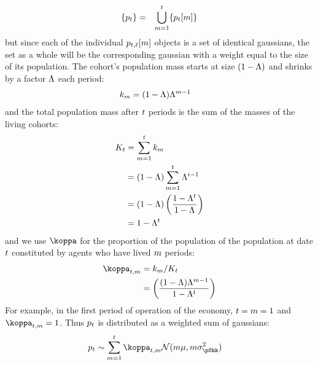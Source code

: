 \documentclass[../BufferStockTheory.tex]{subfiles}\usepackage{ApndxSteadyState}
\begin{document}
  \begin{eqnarray}
    \{p_{t}\} & = & \bigcup_{m=1}^{t}\{p_{t}[m]\}
  \end{eqnarray}
  but since each of the individual $p_{t,\ell}[m]$ objects is a set of identical gaussians, the set as a whole will be the corresponding gaussian with a weight equal to the size of its population.  The cohort's population mass starts at size $(1-\Lambda)$ and shrinks by a factor $\Lambda$ each period:
  \begin{align}
    k_{m} & =  (1-\Lambda)\Lambda^{m-1} \label{eq:mass}
  \end{align}
  and the total population mass after $t$ periods is the sum of the masses of the living cohorts:
  \begin{align}
    K_{t} & =  \sum_{m=1}^{t}k_{m}
    \\ & =  (1-\Lambda)\sum_{m=1}^{t}\Lambda^{i-1}
    \\ & =  (1-\Lambda)\left(\frac{1-\Lambda^{t}}{1-\Lambda}\right)
    \\ & = 1-\Lambda^{t}
  \end{align}
  and we use $\wgt$ for the proportion of the population of the population at date $t$ constituted by agents who have lived $m$ periods:
  \begin{align}
    \wgt_{\FutPer,\LooPer} & =  \mass_{\LooPer}/\Mass_{\FutPer}
    \\ & = \left(\frac{(1-\Liv)\Liv^{\LooPer-1}}{1-\Liv^{\FutPer}}\right) \label{eq:wgt}
  \end{align}
  For example, in the first period of operation of the economy, $t=m=1$ and $\wgt_{\FutPer,\LooPer}=1$.
  Thus $p_{t}$ is distributed as a weighted sum of gaussians:
  \begin{align}
    \pLog_{\FutPer} & \sim \sum_{\LooPer=1}^{\FutPer}\wgt_{\FutPer,\LooPer}\mathcal{N}(\LooPer \pShkMean,\LooPer \sigma^{2}_{\pShk})
  \end{align}
\end{document}
